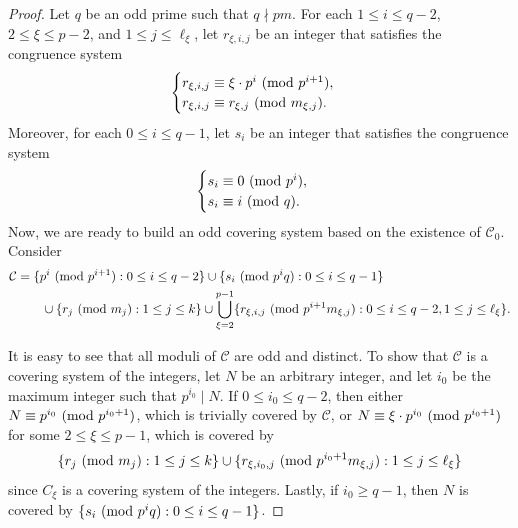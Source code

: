 \documentclass[10pt,a4paper]{amsart}
\renewcommand{\mod}[2]{#1\textup{ (mod }#2\textup{)}}
\begin{document}
\begin{proof}
Let $q$ be an odd prime such that $q\nmid pm$. For each $1\leq i\leq q-2$, $2\leq\xi\leq p-2$, and $1\leq j\leq\ell_\xi$, let $r_{\xi,i,j}$ be an integer that satisfies the congruence system
$$\begin{cases}
r_{\xi,i,j}\equiv\mod{\xi\cdot p^i}{p^{i+1}},\\
r_{\xi,i,j}\equiv\mod{r_{\xi,j}}{m_{\xi,j}}.
\end{cases}$$
Moreover, for each $0\leq i\leq q-1$, let $s_i$ be an integer that satisfies the congruence system
$$\begin{cases}
s_i\equiv\mod{0}{p^i},\\
s_i\equiv\mod{i}{q}.
\end{cases}$$
Now, we are ready to build an odd covering system based on the existence of $\mathcal{C}_0$. Consider
\begin{align*}
\mathcal{C}&=\{\mod{p^i}{p^{i+1}}:0\leq i\leq q-2\}\cup\{\mod{s_i}{p^iq}:0\leq i\leq q-1\}\\
&\hspace{20pt}\cup\{\mod{r_j}{m_j}:1\leq j\leq k\}\cup\bigcup_{\xi=2}^{p-1}\{\mod{r_{\xi,i,j}}{p^{i+1}m_{\xi,j}}:0\leq i\leq q-2,1\leq j\leq\ell_\xi\}.
\end{align*}

It is easy to see that all moduli of $\mathcal{C}$ are odd and distinct. To show that $\mathcal{C}$ is a covering system of the integers, let $N$ be an arbitrary integer, and let $i_0$ be the maximum integer such that $p^{i_0}\mid N$. If $0\leq i_0\leq q-2$, then either $N\equiv\mod{p^{i_0}}{p^{i_0+1}}$, which is trivially covered by $\mathcal{C}$, or $N\equiv\mod{\xi\cdot p^{i_0}}{p^{i_0+1}}$ for some $2\leq\xi\leq p-1$, which is covered by 
$$\{\mod{r_j}{m_j}:1\leq j\leq k\}\cup\{\mod{r_{\xi,i_0,j}}{p^{i_0+1}m_{\xi,j}}:1\leq j\leq\ell_\xi\}$$
since $C_\xi$ is a covering system of the integers. Lastly, if $i_0\geq q-1$, then $N$ is covered by $\{\mod{s_i}{p^iq}:0\leq i\leq q-1\}$.
\end{proof}
\end{document}
